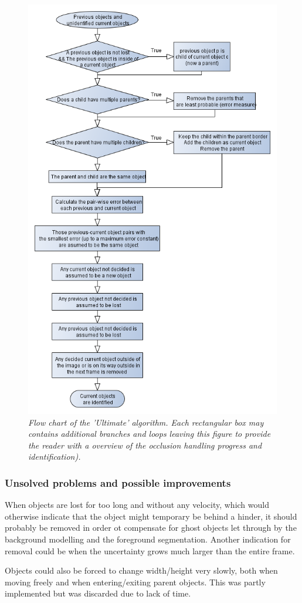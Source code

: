 \newpage
\begin{figure}[htb]
	\centering
	\includegraphics[width=123.5mm]{images/data_flow_identification.png}
	\caption{\textit{Flow chart of the 'Ultimate' algorithm. Each rectangular box may contains additional branches and loops leaving this figure to provide the reader with a overview of the occlusion handling progress and identification).}}
	\label{fig:ObjID_fig} %
\end{figure}

\subsubsection{Unsolved problems and possible improvements}
When objects are lost for too long and without any velocity, which would otherwise indicate that the object might temporary be behind a hinder, it should probably be removed in order ot compensate for ghost objects let through by the background modelling and the foreground segmentation. Another indication for removal could be when the uncertainty grows much larger than the entire frame.

Objects could also be forced to change width/height very slowly, both when moving freely and when entering/exiting parent objects. This was partly implemented but was discarded due to lack of time.